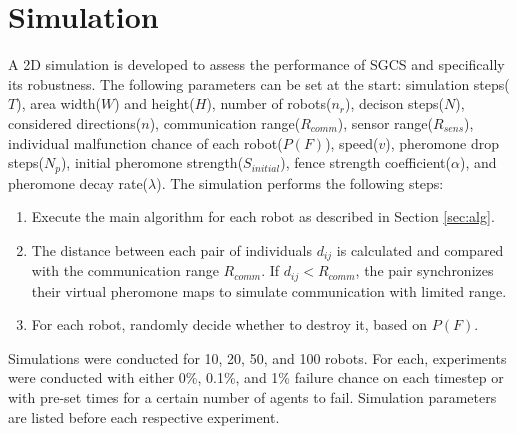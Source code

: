 \section{Simulation}
\label{sec:sim}
A 2D simulation is developed to assess the performance of SGCS and specifically its robustness. The following parameters can be set at the start: simulation steps($T$), area width($W$) and height($H$), number of robots($n_r$), decison steps($N$), considered directions($n$), communication range($R_{comm}$), sensor range($R_{sens}$), individual malfunction chance of each robot($P(F)$), speed($v$), pheromone drop steps($N_p$), initial pheromone strength($S_{initial}$), fence strength coefficient($\alpha$), and pheromone decay rate($\lambda$). 
The simulation performs the following steps:
\begin{enumerate}
	\item Execute the main algorithm for each robot as described in Section \ref{sec:alg}.
	\item The distance between each pair of individuals $d_{ij}$ is calculated and compared with the communication range $R_{comm}$. If $d_{ij}<R_{comm}$, the pair synchronizes their virtual pheromone maps to simulate communication with limited range.
	\item For each robot, randomly decide whether to destroy it, based on $P(F)$. 
\end{enumerate}
Simulations were conducted for 10, 20, 50, and 100 robots. For each, experiments were conducted with either 0\%, 0.1\%, and 1\% failure chance on each timestep or with pre-set times for a certain number of agents to fail. Simulation parameters are listed before each respective experiment.
